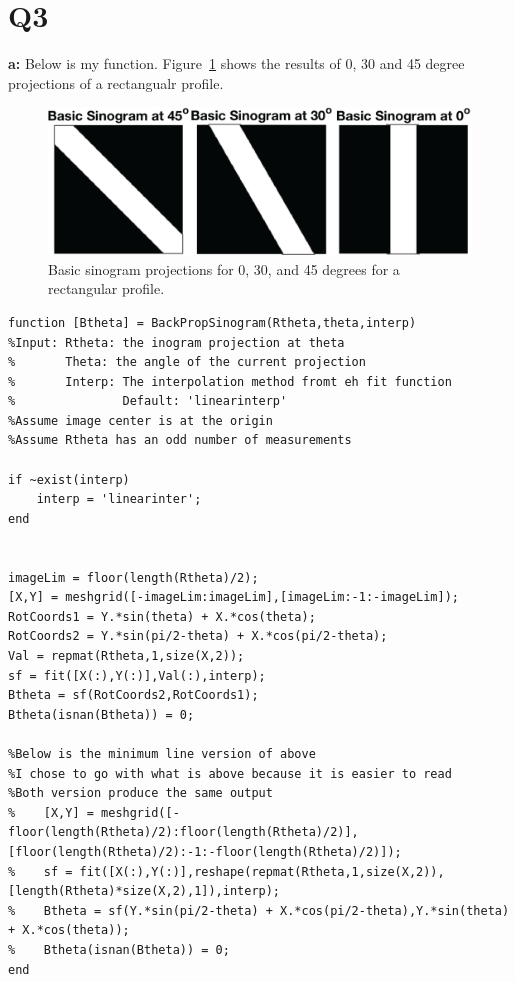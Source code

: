 \documentclass[12pt]{article}
\begin{document}
\section{Q3}
\noindent\textbf{a: }
Below is my function. Figure~\ref{basic} shows the results of 0, 30 and 45 degree projections of a rectangualr profile.

\begin{figure}[H]
	
	\includegraphics[width=\textwidth]{basicone.png}
	\caption{Basic sinogram projections for 0, 30, and 45 degrees for a rectangular profile.}
	\label{basic}
\end{figure}
\begin{lstlisting}[style=Matlab-editor]
function [Btheta] = BackPropSinogram(Rtheta,theta,interp)
%Input: Rtheta: the inogram projection at theta
%       Theta: the angle of the current projection
%       Interp: The interpolation method fromt eh fit function
%               Default: 'linearinterp'
%Assume image center is at the origin
%Assume Rtheta has an odd number of measurements

if ~exist(interp)
	interp = 'linearinter';
end


imageLim = floor(length(Rtheta)/2);
[X,Y] = meshgrid([-imageLim:imageLim],[imageLim:-1:-imageLim]);
RotCoords1 = Y.*sin(theta) + X.*cos(theta);
RotCoords2 = Y.*sin(pi/2-theta) + X.*cos(pi/2-theta);
Val = repmat(Rtheta,1,size(X,2));
sf = fit([X(:),Y(:)],Val(:),interp);
Btheta = sf(RotCoords2,RotCoords1);
Btheta(isnan(Btheta)) = 0;

%Below is the minimum line version of above
%I chose to go with what is above because it is easier to read
%Both version produce the same output
%    [X,Y] = meshgrid([-floor(length(Rtheta)/2):floor(length(Rtheta)/2)],[floor(length(Rtheta)/2):-1:-floor(length(Rtheta)/2)]);
%    sf = fit([X(:),Y(:)],reshape(repmat(Rtheta,1,size(X,2)),[length(Rtheta)*size(X,2),1]),interp);
%    Btheta = sf(Y.*sin(pi/2-theta) + X.*cos(pi/2-theta),Y.*sin(theta) + X.*cos(theta));
%    Btheta(isnan(Btheta)) = 0;
end
\end{lstlisting}
\end{document}
